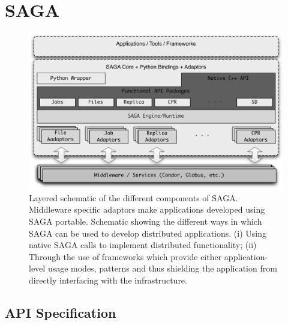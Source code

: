                                         
\section {SAGA}

\begin{figure}
    \includegraphics[width=1.0\textwidth]{./figures/figure_02}
    \caption{\footnotesize Layered schematic of the different components
    of SAGA.  Middleware specific adaptors make applications developed
    using SAGA portable.  Schematic showing the different ways in which
    SAGA can be used to develop distributed applications. (i) Using
    native SAGA calls to implement distributed functionality; (ii)
    Through the use of frameworks which provide either application-level
    usage modes, patterns and thus shielding the application from
    directly interfacing with the infrastructure.} \label{sagalayer}
\end{figure}
	
	
\subsection{API Specification}	

